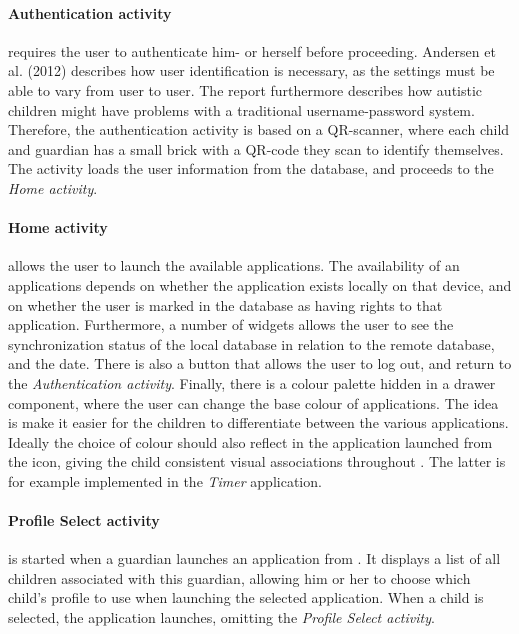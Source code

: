 \paragraph{Authentication activity} requires the user to authenticate him- or herself before proceeding. 
Andersen et al. (2012) describes how user identification is necessary, as the \giraf settings must be able to vary from user to user. 
The report furthermore describes how autistic children might have problems with a traditional username-password system. 
Therefore, the authentication activity is based on a QR-scanner, where each child and guardian has a small brick with a QR-code they scan to identify 		  	themselves. 
The activity loads the user information from the database, and proceeds to the \textit{Home activity}.

\paragraph{Home activity} allows the user to launch the available \giraf applications. 
The availability of an applications depends on whether the application exists locally on that device, and on whether the user is marked in the database as 	having rights to that application. 
Furthermore, a number of widgets allows the user to see the synchronization status of the local database in relation to the remote database, and the 	 	date. 
There is also a button that allows the user to log out, and return to the \textit{Authentication activity}. 
Finally, there is a colour palette hidden in a drawer component, where the user can change the base colour of applications. 
The idea is make it easier for the children to differentiate between the various applications. 
Ideally the choice of colour should also reflect in the application launched from the icon, giving the child consistent visual associations throughout \giraf.
The latter is for example implemented in the \textit{Timer} application.

\paragraph{Profile Select activity} is started when a guardian launches an application from \launcher. 
It displays a list of all children associated with this guardian, allowing him or her to choose which child's profile to use when launching the selected application. 
When a child is selected, the application launches, omitting the \textit{Profile Select activity}.